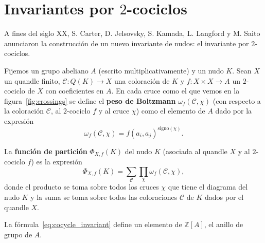 \documentclass[graybox]{svmult}
\newcommand{\Z}{\mathbb{Z}}
\begin{document}
\section{Invariantes por $2$-cociclos}
\label{section:cocycles}

A fines del siglo XX, S. Carter, D. Jelsovsky, S. Kamada, L. Langford y M.
Saito anunciaron la construcción de un nuevo invariante de nudos: el invariante
por $2$-cociclos.

Fijemos un grupo abeliano $A$ (escrito multiplicativamente) y un nudo $K$.
Sean $X$ un quandle finito, $\mathcal{C}\colon Q(K)\to X$ una coloración de $K$ y 
$f\colon X\times X\to A$ 
un $2$-cociclo de $X$ con coeficientes en $A$. En cada cruce como el que vemos en la
figura~\ref{fig:crossings} se define el \textbf{peso de Boltzmann}
$\omega_f(\mathcal{C},\chi)$ (con respecto a la coloración $\mathcal{C}$, al
$2$-cociclo $f$ y al cruce $\chi$) como el elemento de $A$ dado por la
expresión 
\[
	\omega_f(\mathcal{C},\chi) =f(a_i,a_j)^{\mathrm{signo}(\chi)}.
\]

\begin{definition}
	La \textbf{función de partición} $\Phi_{X,f}(K)$ del nudo $K$ (asociada al
	quandle $X$ y al $2$-cociclo $f$) es la expresión
	\begin{equation}
		\label{eq:cocycle_invariant}
		\Phi_{X,f}(K)=\sum_{\mathcal{C}}\prod_{\chi}\omega_f(\mathcal{C},\chi),
	\end{equation}
	donde el producto se toma sobre todos los cruces $\chi$ que tiene el
	diagrama del nudo $K$ y la suma se toma sobre todos las coloraciones
	$\mathcal{C}$ de $K$ dados por el quandle $X$.  
\end{definition}

La fórmula~\eqref{eq:cocycle_invariant} define un elemento de $\Z[A]$, el
anillo de grupo de $A$.
\end{document}
